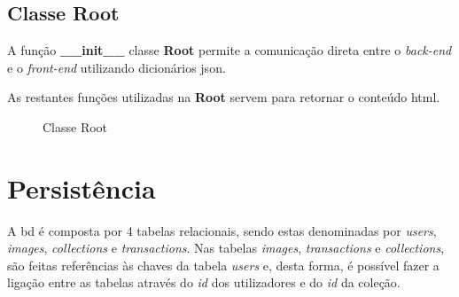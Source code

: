\documentclass{report}
\begin{document}
\subsection{Classe Root}
\label{ssec.root}

A função \textbf{\_\_init\_\_} classe \textbf{Root} permite a comunicação direta entre o \textit{back-end} e o \textit{front-end} utilizando dicionários \ac{json}.

As restantes funções utilizadas na \textbf{Root} servem para retornar o conteúdo \ac{html}.

\begin{figure}[H]%
    \centering
    \qquad
    \caption{Classe Root}%
    \label{fig:rootimg}%
\end{figure}

\section{Persistência}
\label{sec.persistencia}

A \ac{bd} é composta por 4 tabelas relacionais, sendo estas denominadas por \textit{users}, \textit{images}, \textit{collections} e \textit{transactions}. Nas tabelas \textit{images}, \textit{transactions} e \textit{collections}, são feitas referências às chaves da tabela \textit{users} e, desta forma, é possível fazer a ligação entre as tabelas através do \textit{id} dos utilizadores e do \textit{id} da coleção.
\end{document}

